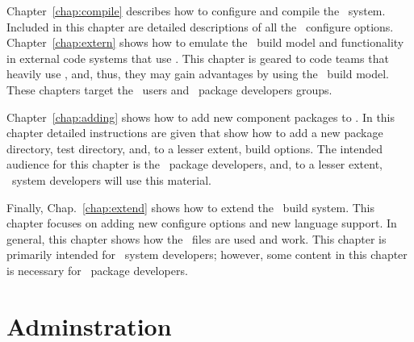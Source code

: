 Chapter~\ref{chap:compile} describes how to configure and compile the
\draco\ system.  Included in this chapter are detailed descriptions of
all the \draco\ configure options. Chapter~\ref{chap:extern} shows how
to emulate the \draco\ build model and functionality in external code
systems that use \draco.  This chapter is geared to code teams that
heavily use \draco, and, thus, they may gain advantages by using the
\draco\ build model. These chapters target the \draco\ users and
\draco\ package developers groups.

Chapter~\ref{chap:adding} shows how to add new component packages to
\draco.  In this chapter detailed instructions are given that show how
to add a new package directory, test directory, and, to a lesser
extent, build options.  The intended audience for this chapter is the
\draco\ package developers, and, to a lesser extent, \draco\ system
developers will use this material.

Finally, Chap.~\ref{chap:extend} shows how to extend the \draco\ build 
system.  This chapter focuses on adding new configure options and new
language support.  %
In general, this chapter shows how the \cmake\ files are used and work.
 This chapter is primarily intended
for \draco\ system developers; however, some content in this chapter
is necessary for \draco\ package developers.

\section{Adminstration}
\label{sec:admin}

